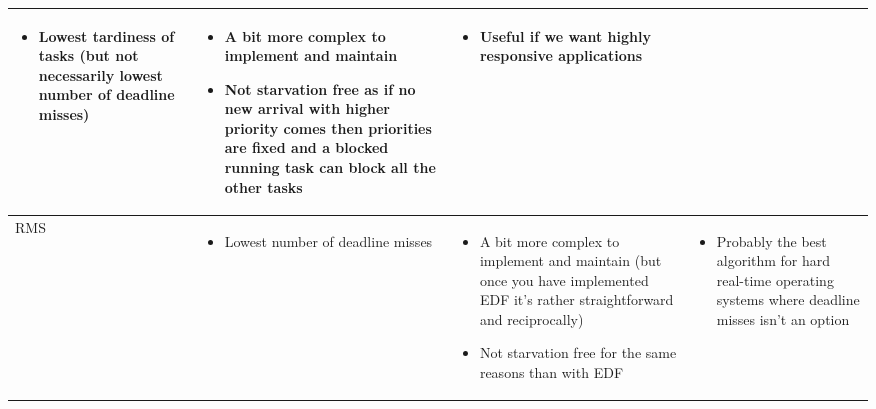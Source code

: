 \documentclass[./report.tex]{subfiles}
\begin{document}
\begin{tabular}{|m{8em}|m{12em}|m{12em}|m{12em}|}
\begin{itemize}[leftmargin=*]
		\item Lowest tardiness of tasks (but not necessarily lowest number of deadline misses)
	\end{itemize}
	&  
	\begin{itemize}[leftmargin=*]
		\item A bit more complex to implement and maintain
		\item Not starvation free as if no new arrival with higher priority comes then priorities are fixed and a blocked running task can block all the other tasks
	\end{itemize}
	& 
	\begin{itemize}[leftmargin=*]
		\item Useful if we want highly responsive applications
	\end{itemize}
	\\
	\hline
	RMS 
	&  
	\begin{itemize}[leftmargin=*]
		\item Lowest number of deadline misses
	\end{itemize}
	&  
	\begin{itemize}[leftmargin=*]
		\item  A bit more complex to implement and maintain (but once you have implemented EDF it's rather straightforward and reciprocally)
		\item Not starvation free for the same reasons than with EDF
	\end{itemize}
	& 
	\begin{itemize}[leftmargin=*]
		\item Probably the best algorithm for hard real-time operating systems where deadline misses isn't an option
	\end{itemize}
	\\
	\hline
\end{tabular}
\end{document}
